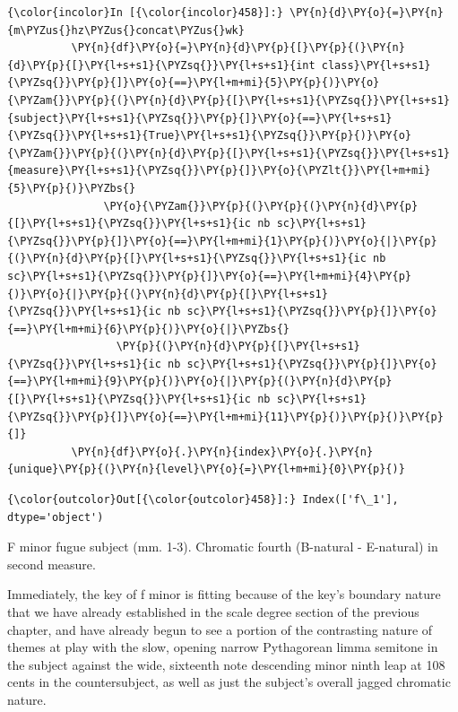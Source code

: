     \begin{Verbatim}[commandchars=\\\{\}]
{\color{incolor}In [{\color{incolor}458}]:} \PY{n}{d}\PY{o}{=}\PY{n}{m\PYZus{}hz\PYZus{}concat\PYZus{}wk}
          \PY{n}{df}\PY{o}{=}\PY{n}{d}\PY{p}{[}\PY{p}{(}\PY{n}{d}\PY{p}{[}\PY{l+s+s1}{\PYZsq{}}\PY{l+s+s1}{int class}\PY{l+s+s1}{\PYZsq{}}\PY{p}{]}\PY{o}{==}\PY{l+m+mi}{5}\PY{p}{)}\PY{o}{\PYZam{}}\PY{p}{(}\PY{n}{d}\PY{p}{[}\PY{l+s+s1}{\PYZsq{}}\PY{l+s+s1}{subject}\PY{l+s+s1}{\PYZsq{}}\PY{p}{]}\PY{o}{==}\PY{l+s+s1}{\PYZsq{}}\PY{l+s+s1}{True}\PY{l+s+s1}{\PYZsq{}}\PY{p}{)}\PY{o}{\PYZam{}}\PY{p}{(}\PY{n}{d}\PY{p}{[}\PY{l+s+s1}{\PYZsq{}}\PY{l+s+s1}{measure}\PY{l+s+s1}{\PYZsq{}}\PY{p}{]}\PY{o}{\PYZlt{}}\PY{l+m+mi}{5}\PY{p}{)}\PYZbs{}
               \PY{o}{\PYZam{}}\PY{p}{(}\PY{p}{(}\PY{n}{d}\PY{p}{[}\PY{l+s+s1}{\PYZsq{}}\PY{l+s+s1}{ic nb sc}\PY{l+s+s1}{\PYZsq{}}\PY{p}{]}\PY{o}{==}\PY{l+m+mi}{1}\PY{p}{)}\PY{o}{|}\PY{p}{(}\PY{n}{d}\PY{p}{[}\PY{l+s+s1}{\PYZsq{}}\PY{l+s+s1}{ic nb sc}\PY{l+s+s1}{\PYZsq{}}\PY{p}{]}\PY{o}{==}\PY{l+m+mi}{4}\PY{p}{)}\PY{o}{|}\PY{p}{(}\PY{n}{d}\PY{p}{[}\PY{l+s+s1}{\PYZsq{}}\PY{l+s+s1}{ic nb sc}\PY{l+s+s1}{\PYZsq{}}\PY{p}{]}\PY{o}{==}\PY{l+m+mi}{6}\PY{p}{)}\PY{o}{|}\PYZbs{}
                 \PY{p}{(}\PY{n}{d}\PY{p}{[}\PY{l+s+s1}{\PYZsq{}}\PY{l+s+s1}{ic nb sc}\PY{l+s+s1}{\PYZsq{}}\PY{p}{]}\PY{o}{==}\PY{l+m+mi}{9}\PY{p}{)}\PY{o}{|}\PY{p}{(}\PY{n}{d}\PY{p}{[}\PY{l+s+s1}{\PYZsq{}}\PY{l+s+s1}{ic nb sc}\PY{l+s+s1}{\PYZsq{}}\PY{p}{]}\PY{o}{==}\PY{l+m+mi}{11}\PY{p}{)}\PY{p}{)}\PY{p}{]}
          \PY{n}{df}\PY{o}{.}\PY{n}{index}\PY{o}{.}\PY{n}{unique}\PY{p}{(}\PY{n}{level}\PY{o}{=}\PY{l+m+mi}{0}\PY{p}{)}
\end{Verbatim}
\begin{Verbatim}[commandchars=\\\{\}]
{\color{outcolor}Out[{\color{outcolor}458}]:} Index(['f\_1'], dtype='object')
\end{Verbatim}


\begin{Example}[H]
    \begin{center}
    \caption[Chromatic fourth in f minor fugue subject (mm. 1-3). ]{ F minor fugue subject (mm. 1-3). Chromatic fourth (B-natural - E-natural) in second measure.}
    \end{center}
\end{Example}
    
    Immediately, the key of f minor is fitting because of the key's boundary
nature that we have already established in the scale degree section of
the previous chapter, and have already begun to see a portion of the
contrasting nature of themes at play with the slow, opening narrow
Pythagorean limma semitone in the subject against the wide, sixteenth
note descending minor ninth leap at 108 cents in the countersubject, as
well as just the subject's overall jagged chromatic nature.

